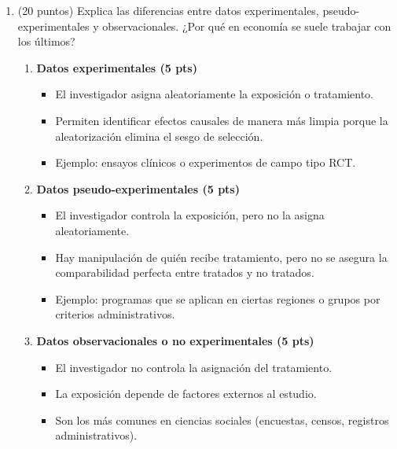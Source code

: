 \documentclass[10pt,a4paper]{article}
\begin{document}
 
\begin{enumerate}
    \item (20 puntos) Explica las diferencias entre datos experimentales, pseudo-experimentales y observacionales. ¿Por qué en economía se suele trabajar con los últimos?

{\color{blue}   

\begin{enumerate}
    \item \textbf{Datos experimentales (5 pts)}  
    \begin{itemize}
        \item El investigador asigna aleatoriamente la exposición o tratamiento.  
        \item Permiten identificar efectos causales de manera más limpia porque la aleatorización elimina el sesgo de selección.  
        \item Ejemplo: ensayos clínicos o experimentos de campo tipo RCT.
    \end{itemize}

    \item \textbf{Datos pseudo-experimentales (5 pts)}  
    \begin{itemize}
        \item El investigador controla la exposición, pero no la asigna aleatoriamente.  
        \item Hay manipulación de quién recibe tratamiento, pero no se asegura la comparabilidad perfecta entre tratados y no tratados.  
        \item Ejemplo: programas que se aplican en ciertas regiones o grupos por criterios administrativos.
    \end{itemize}

    \item \textbf{Datos observacionales o no experimentales (5 pts)}  
    \begin{itemize}
        \item El investigador no controla la asignación del tratamiento.  
        \item La exposición depende de factores externos al estudio.  
        \item Son los más comunes en ciencias sociales (encuestas, censos, registros administrativos).
    \end{itemize}


\end{enumerate}}
\end{enumerate}
\end{document}
